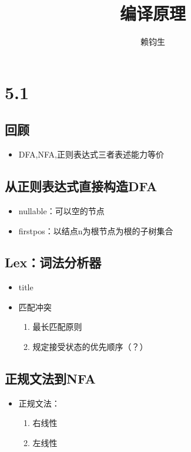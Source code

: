 \documentclass[UTF8]{article}
\title{\textbf{编译原理}}
\author{赖钧生}
\begin{document}
\maketitle

\section*{5.1}
\subsection{回顾}
\begin{itemize}
	\item DFA,NFA,正则表达式三者表述能力等价
\end{itemize}


\subsection{从正则表达式直接构造DFA}
\begin{itemize}
	\item nullable：可以空的节点
	\item firstpos：以结点n为根节点为根的子树集合
\end{itemize}
	

\subsection{Lex：词法分析器}
\begin{itemize}
	\item title
	\item 匹配冲突
	\begin{enumerate}
		\item 最长匹配原则
		\item 规定接受状态的优先顺序（？）
	\end{enumerate}
\end{itemize}

\subsection{正规文法到NFA}
\begin{itemize}
	\item 正规文法：
	\begin{enumerate}
		\item 右线性
		\item 左线性
	\end{enumerate}
\end{itemize}
\end{document}
